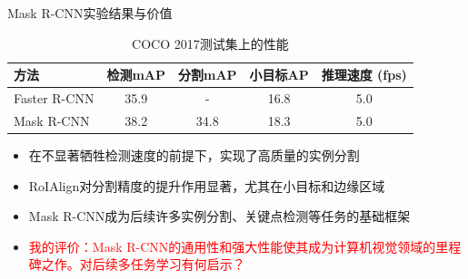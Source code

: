 \documentclass{beamer}
\begin{document}
\begin{frame}{Mask R-CNN实验结果与价值}
    \begin{table}
        \centering
        \caption{COCO 2017测试集上的性能}
        \begin{tabular}{lcccc}
            \toprule
            方法 & 检测mAP & 分割mAP & 小目标AP & 推理速度 (fps) \\ 
            \midrule
            Faster R-CNN & 35.9 & - & 16.8 & 5.0 \\ %
            Mask R-CNN & 38.2 & 34.8 & 18.3 & 5.0 \\ %
            \bottomrule
        \end{tabular}
    \end{table}
    
    \begin{itemize}
        \item 在不显著牺牲检测速度的前提下，实现了高质量的实例分割
        \item RoIAlign对分割精度的提升作用显著，尤其在小目标和边缘区域
        \item Mask R-CNN成为后续许多实例分割、关键点检测等任务的基础框架
        \item \textcolor{red}{我的评价：Mask R-CNN的通用性和强大性能使其成为计算机视觉领域的里程碑之作。对后续多任务学习有何启示？}
    \end{itemize}
\end{frame}
\end{document}
